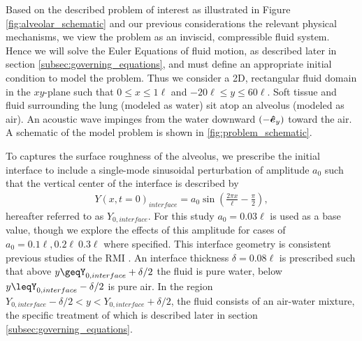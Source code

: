 % 
Based on the described problem of interest as illustrated in Figure
\ref{fig:alveolar_schematic} and our previous considerations the
relevant physical mechanisms, we view the problem as an inviscid,
compressible fluid system. Hence we will solve the Euler Equations of
fluid motion, as described later in section
\ref{subsec:governing_equations}, and must define an appropriate
initial condition to model the problem. Thus we consider a 2D,
rectangular fluid domain in the $xy$-plane such that
$0\leq x\leq 1\ell$ and $-20\ell\leq y\leq 60\ell$. Soft tissue and
fluid surrounding the lung (modeled as water) sit atop an alveolus
(modeled as air). An acoustic wave impinges from the water downward
$(-\boldsymbol{\hat{e}}_y)$ toward the air. A schematic of the model problem
is shown in \ref{fig:problem_schematic}.

To captures the surface roughness of the alveolus, we prescribe the
initial interface to include a single-mode sinusoidal perturbation of
amplitude $a_0$ such that the vertical center of the interface is
described by
\begin{align} %
  Y(x,t=0)_{interface} = a_0\sin\left(\frac{2\pi x}{\ell}-\frac{\pi}{2}\right),
\end{align}
hereafter referred to as $Y_{0,interface}$. For this study
$a_0=0.03\ell$ is used as a base value, though we explore the effects
of this amplitude for cases of $a_0=0.1\ell, 0.2\ell\ 0.3\ell$ where
specified. This interface geometry is consistent previous studies of
the \ac{RMI} \citep{Brouillette2002}. An interface thickness
$\delta=0.08\ell$ is prescribed such that above
$y\geqY_{0,interface}+\delta/2$ the fluid is pure water, below
$y\leqY_{0,interface}-\delta/2$ is pure air. In the region
$Y_{0,interface}-\delta/2 < y < Y_{0,interface}+\delta/2$, the fluid
consists of an air-water mixture, the specific treatment of which is
described later in section \ref{subsec:governing_equations}.

